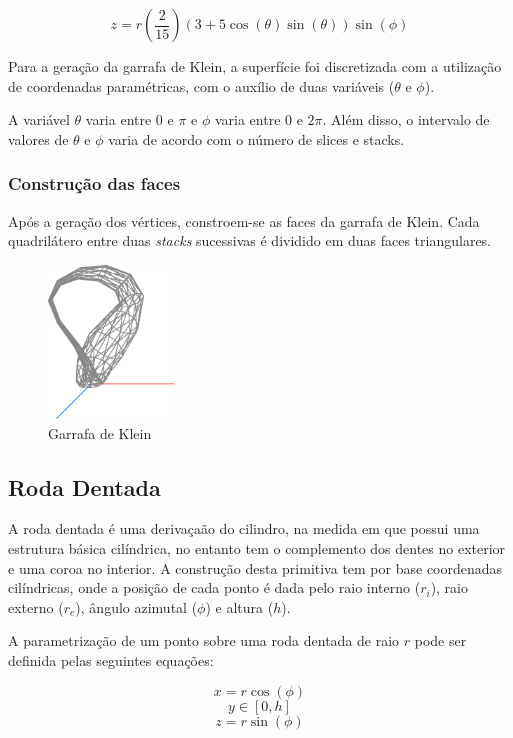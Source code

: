 \documentclass[12pt, a4paper]{article}
\begin{document}
$$
z = r \left( \frac{2}{15} \right) (3 + 5 \cos(\theta) \sin(\theta)) \sin(\phi)
$$

Para a geração da garrafa de Klein, a superfície foi discretizada com a utilização de coordenadas
paramétricas, com o auxílio de duas variáveis ($\theta$ e $\phi$).

A variável $\theta$ varia entre $0$ e $\pi$ e $\phi$ varia entre $0$ e $2\pi$. Além disso, o
intervalo de valores de $\theta$ e $\phi$ varia de acordo com o número de slices e stacks.

\subsubsection{Construção das faces}

Após a geração dos vértices, constroem-se as faces da garrafa de Klein. Cada quadrilátero entre duas
\emph{stacks} sucessivas é dividido em duas faces triangulares.

\begin{figure}[H]
    \centering
    \includegraphics[width=0.3\textwidth]{res/phase2/figures/kleinBottle.pdf}
    \caption{Garrafa de Klein}
\end{figure}

\subsection{Roda Dentada}

A roda dentada é uma derivaçaão do cilindro, na medida em que possui uma estrutura básica
cilíndrica, no entanto tem o complemento dos dentes no exterior e uma coroa no interior. A
construção desta primitiva tem por base coordenadas cilíndricas, onde a posição de cada ponto é
dada pelo raio interno ($r_i$), raio externo ($r_e$), ângulo azimutal ($\phi$) e altura ($h$).

A parametrização de um ponto sobre uma roda dentada de raio \( r \) pode ser definida
pelas seguintes equações:

$$x = r \cos(\phi)$$
$$y \in \left [ 0, h \right ]$$
$$z =  r \sin(\phi)$$
\end{document}
